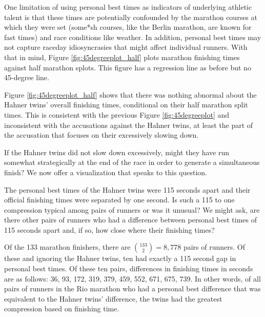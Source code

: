 \documentclass[12pt,titlepage]{article}
\begin{document}
One limitation of using personal best times as indicators of
underlying athletic talent is that these times are potentially
confounded by the marathon courses at which they were set (some*sh
courses, like the Berlin marathon, are known for fast times) and race
conditions like weather.  In addition, personal best times may not
capture raceday idiosyncrasies that might affect individual runners.
With that in mind, Figure \ref{fig:45degreeplot_half} plots marathon
finishing times against half marathon splots.  This figure has a
regression line as before but no 45-degree line.

Figure \ref{fig:45degreeplot_half} shows that there was nothing
abnormal about the Hahner twins' overall finishing times, conditional
on their half marathon split times.  This is consistent with the
previous Figure \ref{fig:45degreeplot} and inconsistent with the
accusations against the Hahner twins, at least the part of the
accusation that focuses on their excessively slowing down.

If the Hahner twins did not slow down excessively, might they have
run somewhat strategically at the end of the race in order to generate
a simultaneous finish?  We now offer a visualization that speaks to
this question.

The personal best times of the Hahner twins were 115 seconds apart and
their official finishing times were separated by one second.  Is such
a 115 to one compression typical among pairs of runners or was it
unusual?  We might ask, are there other pairs of runners who had a
difference between personal best times of 115 seconds apart and, if
so, how close where their finishing times?

Of the 133 marathon finishers, there are $\binom{133}{2} = 8,778$
pairs of runners.  Of these and ignoring the Hahner twins, ten had
exactly a 115 second gap in personal best times.  Of these ten pairs,
differences in finishing times in seconds are as follows: 36, 93, 172,
319, 379, 459, 552, 671, 675, 739.  In other words, of all pairs of
runners in the Rio marathon who had a personal best difference that
was equivalent to the Hahner twins' difference, the twins had the
greatest compression based on finishing time.  
\end{document}
